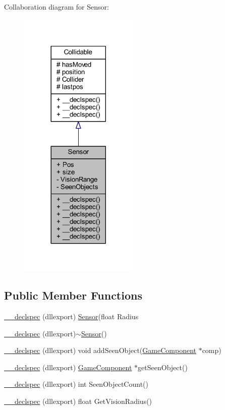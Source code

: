 Collaboration diagram for Sensor\-:
\nopagebreak
\begin{figure}[H]
\begin{center}
\leavevmode
\includegraphics[width=161pt]{class_sensor__coll__graph}
\end{center}
\end{figure}
\subsection*{Public Member Functions}
\begin{DoxyCompactItemize}
\item 
\hyperlink{class_sensor_a4f89a2fee3bb2c07456663cf1754349f}{\-\_\-\-\_\-declspec} (dllexport) \hyperlink{class_sensor}{Sensor}(float Radius
\item 
\hyperlink{class_sensor_abc51a9ae7218821ab1b654128c86e040}{\-\_\-\-\_\-declspec} (dllexport)$\sim$\hyperlink{class_sensor}{Sensor}()
\item 
\hyperlink{class_sensor_ae45fa029bf2b21de83d61f844264737e}{\-\_\-\-\_\-declspec} (dllexport) void add\-Seen\-Object(\hyperlink{class_game_component}{Game\-Component} $\ast$comp)
\item 
\hyperlink{class_sensor_ab8b300abed2a48c4d8eb428b98f61b26}{\-\_\-\-\_\-declspec} (dllexport) \hyperlink{class_game_component}{Game\-Component} $\ast$get\-Seen\-Object()
\item 
\hyperlink{class_sensor_acec7b3c912027a73cf8bb6bd9b8dea93}{\-\_\-\-\_\-declspec} (dllexport) int Seen\-Object\-Count()
\item 
\hyperlink{class_sensor_ae6cb553783aed562549b97a02ba46d3d}{\-\_\-\-\_\-declspec} (dllexport) float Get\-Vision\-Radius()
\end{DoxyCompactItemize}
